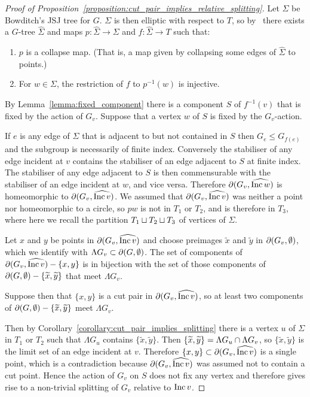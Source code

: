 \begin{proof}[Proof of Proposition~\ref{proposition:cut_pair_implies_relative_splitting}]
Let $\Sigma$ be Bowditch's JSJ tree for $G$. $\Sigma$ is then elliptic with respect to $T$, so by~\cite[Proposition 2.2]{guirardellevitt17} there exists a $G$-tree $\widehat\Sigma$ and maps $p \colon \widehat\Sigma \to \Sigma$ and $f \colon \widehat\Sigma \to T$ such that:
\begin{enumerate}
  \item $p$ is a collapse map. (That is, a map given by collapsing some edges of $\widehat\Sigma$ to points.)
  \item For $w \in \Sigma$, the restriction of $f$ to $p^{-1}(w)$ is injective.
\end{enumerate}

By Lemma~\ref{lemma:fixed_component} there is a component $S$ of $f^{-1}(v)$ that is fixed by the action of $G_v$.
Suppose that a vertex $w$ of $S$ is fixed by the $G_v$-action.

If $e$ is any edge of $\widehat\Sigma$ that is adjacent to but not contained in $S$ then $G_e \leq G_{f(e)}$ and the subgroup is necessarily of finite index. 
Conversely the stabiliser of any edge incident at $v$ contains the stabiliser of an edge adjacent to $S$ at finite index. 
The stabiliser of any edge adjacent to $S$ is then commensurable with the stabiliser of an edge incident at $w$, and vice versa. 
Therefore $\partial(G_v, \widehat{\operatorname{\mathrm{Inc}} w})$ is homeomorphic to $\partial(G_v, \widehat{\operatorname{\mathrm{Inc}} v})$. 
We assumed that $\partial(G_v, \widehat{\operatorname{\mathrm{Inc}} v})$ was neither a point nor homeomorphic to a circle, so $pw$ is not in $T_1$ or $T_2$, and is therefore in $T_3$, where here we recall the partition $T_1\sqcup T_2\sqcup T_3$ of vertices of $\Sigma$.

Let $x$ and $y$ be points in $\partial(G_v, \widehat{\operatorname{\mathrm{Inc}} v})$ and choose preimages $\widetilde{x}$ and $\widetilde{y}$ in $\partial(G_v, \emptyset)$, which we identify with $\Lambda G_v \subset \partial(G, \emptyset)$.  
The set of components of $\partial(G_v, \widehat{\operatorname{\mathrm{Inc}} v}) - \{x, y\}$ is in bijection with the set of those components of $\partial(G, \emptyset) - \{\widetilde{x}, \widetilde{y}\}$ that meet $\Lambda G_v$. 

Suppose then that $\{x, y\}$ is a cut pair in $\partial(G_v, \widehat{\operatorname{\mathrm{Inc}} v})$, so at least two components of $\partial(G, \emptyset) - \{\widetilde{x}, \widetilde{y}\}$ meet $\Lambda G_v$.

Then by Corollary~\ref{corollary:cut_pair_implies_splitting} there is a vertex $u$ of $\Sigma$ in $T_1$ or $T_2$ such that $\Lambda G_u$ contains $\{\widetilde{x}, \widetilde{y}\}$. 
Then $\{\widetilde{x}, \widetilde{y}\} = \Lambda G_u \cap \Lambda G_v$, so $\{\widetilde{x}, \widetilde{y}\}$ is the limit set of an edge incident at $v$. 
Therefore $\{x, y\} \subset \partial(G_v, \widehat{\operatorname{\mathrm{Inc}} v})$ is a single point, which is a contradiction because $\partial(G_v, \widehat{\operatorname{\mathrm{Inc}} v})$ was assumed not to contain a cut point. 
Hence the action of $G_v$ on $S$ does not fix any vertex and therefore gives rise to a non-trivial splitting of $G_v$ relative to $\operatorname{\mathrm{Inc}} v$.

\end{proof}

